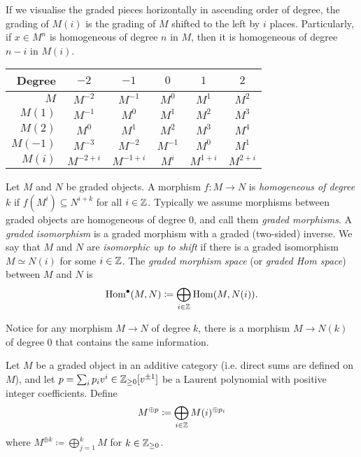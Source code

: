 If we visualise the graded pieces horizontally in ascending order of degree, the grading of $M(i)$ is the grading of $M$ shifted to the left by $i$ places. Particularly, if $x \in M^n$ is homogeneous of degree $n$ in $M$, then it is homogeneous of degree $n - i$ in $M(i)$.
\begin{center}
    \begin{tabular}{ |r||c|c|c|c|c| }
        \hline
        \textbf{Degree} & $-2$       & $-1$       & $0$      & $1$       & $2$       \\ \hline
        $M$             & $M^{-2}$   & $M^{-1}$   & $M^0$    & $M^1$     & $M^2$     \\ \hline
        $M(1)$          & $M^{-1}$   & $M^0$      & $M^1$    & $M^2$     & $M^3$     \\ \hline
        $M(2)$          & $M^0$      & $M^1$      & $M^2$    & $M^3$     & $M^4$     \\ \hline
        $M(-1)$         & $M^{-3}$   & $M^{-2}$   & $M^{-1}$ & $M^0$     & $M^1$     \\ \hline
        $M(i)$          & $M^{-2+i}$ & $M^{-1+i}$ & $M^{i}$  & $M^{1+i}$ & $M^{2+i}$ \\ \hline
    \end{tabular}
\end{center}

\begin{definition}
    Let $M$ and $N$ be graded objects. A morphism $f: M \to N$ is \textit{homogeneous of degree $k$} if $f(M^i) \subseteq N^{i+k}$ for all $i \in \mathbb{Z}$. Typically we assume morphisms between graded objects are homogeneous of degree $0$, and call them \textit{graded morphisms}. A \textit{graded isomorphism} is a graded morphism with a graded (two-sided) inverse. We say that $M$ and $N$ are \textit{isomorphic up to shift} if there is a graded isomorphism $M \simeq N(i)$ for some $i \in \mathbb{Z}$. The \textit{graded morphism space} (or \textit{graded Hom space}) between $M$ and $N$ is
    \[
        \operatorname{Hom}^\bullet(M,N) \coloneqq \bigoplus_{i \in \mathbb{Z}} \operatorname{Hom}(M,N(i)).
    \]
\end{definition}

Notice for any morphism $M \to N$ of degree $k$, there is a morphism $M \to N(k)$ of degree $0$ that contains the same information.

\begin{definition}
    Let $M$ be a graded object in an additive category (i.e. direct sums are defined on $M$), and let $p = \sum_i p_i v^i \in \mathbb{Z}_{\geq 0}[v^{\pm 1}]$ be a Laurent polynomial with positive integer coefficients. Define
    \[
        M^{\oplus p} \coloneqq \bigoplus_{i \in \mathbb{Z}} M(i)^{\oplus p_i}
    \]
    where $M^{\oplus k} \coloneqq \bigoplus_{j=1}^k M$ for $k \in \mathbb{Z}_{\geq 0}$.
\end{definition}



